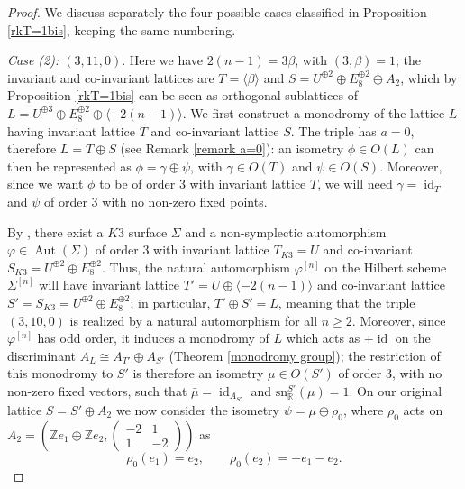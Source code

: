 \documentclass{amsart}
\theoremstyle{definition}
\newcommand{\IZ}{\mathbb{Z}}
\newcommand{\spinn}{\mathrm{sn}_{\mathbb{R}}}
\DeclareMathOperator{\id}{id}
\DeclareMathOperator{\aut}{Aut}
\begin{document}
\begin{proof}
We discuss separately the four possible cases classified in Proposition \ref{rkT=1bis}, keeping the same numbering.

\emph{Case (2): $(3,11,0)$}. Here we have $2(n-1)=3\beta$, with $(3, \beta) =1$; the invariant and co-invariant lattices are $T=\langle \beta \rangle$ and $S = U^{\oplus 2} \oplus E_8^{\oplus 2} \oplus A_2$, which by Proposition \ref{rkT=1bis} can be seen as orthogonal sublattices of $L= U^{\oplus 3} \oplus E_8^{\oplus 2} \oplus \langle -2(n-1) \rangle$. We first construct a monodromy of the lattice $L$ having invariant lattice $T$ and co-invariant lattice $S$. The triple has $a=0$, therefore $L = T \oplus S$ (see Remark \ref{remark a=0}): an isometry $\phi \in O(L)$ can then be represented as $\phi = \gamma \oplus \psi$, with $\gamma \in O(T)$ and $\psi \in O(S)$. Moreover, since we want $\phi$ to be of order $3$ with invariant lattice $T$, we will need $\gamma = \id_T$ and $\psi$ of order $3$ with no non-zero fixed points.
 
By \cite[Theorem 3.3]{autom_k3_ord3}, there exist a $K3$ surface $\Sigma$ and a non-symplectic automorphism $\varphi \in \aut(\Sigma)$ of order $3$ with invariant lattice $T_{K3} = U$ and co-invariant $S_{K3} = U^{\oplus 2} \oplus E_8^{\oplus 2}$. Thus, the natural automorphism $\varphi^{[n]}$ on the Hilbert scheme $\Sigma^{[n]}$ will have invariant lattice $T' = U \oplus \langle -2(n-1) \rangle$ and co-invariant lattice $S' = S_{K3} = U^{\oplus 2} \oplus E_8^{\oplus 2}$; in particular, $T' \oplus S' = L$, meaning that the triple $(3,10,0)$ is  realized by a natural automorphism for all $n \geq 2$. Moreover, since $\varphi^{[n]}$ has odd order, it induces a monodromy of $L$ which acts as $+\id$ on the discriminant $A_L \cong A_{T'} \oplus A_{S'}$ (Theorem \ref{monodromy group}); the restriction of this monodromy to $S'$ is therefore an isometry $\mu \in O(S')$ of order $3$, with no non-zero fixed vectors, such that $\bar{\mu} = \id_{A_{S'}}$ and $\spinn^{S'}(\mu) = 1$. On our original lattice $S = S' \oplus A_2$ we now consider the isometry $\psi = \mu \oplus \rho_0$, where $\rho_0$ acts on $A_2 = \left( \IZ e_1 \oplus \IZ e_2, \left( \begin{smallmatrix} -2&1\\ 1&-2 \end{smallmatrix} \right) \right)$ as
 \[ \rho_0(e_1) = e_2, \qquad \rho_0(e_2) = -e_1 -e_2.\]
 

\end{proof}
\end{document}
